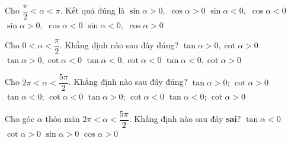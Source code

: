

\begin{ex}%
	Cho $\dfrac{\pi}{2} <\alpha <\pi $. Kết quả đúng là 
	 \choice
		{$\sin \alpha >0,$  $\cos \alpha >0$}
		{$\sin \alpha <0,$ $\cos \alpha  <0$}
		{\True $\sin  \alpha >0,$ $\cos \alpha <0$}
		{$\sin \alpha  <0,$ $\cos \alpha >0$}
\end{ex}

\begin{ex}%
	Cho $0<\alpha <\dfrac{\pi}{2}$. Khẳng định nào  sau đây đúng?
	\choice 
		{\True $\tan \alpha  >0,\cot \alpha >0$}
		{$\tan \alpha >0,\cot \alpha <0$} 
		{$\tan \alpha <0,\cot \alpha <0$} 
		{$\tan \alpha <0,\cot  \alpha >0$}
\end{ex}

\begin{ex}%
	 Cho $2\pi <\alpha <\dfrac{5\pi}{2}$. Khẳng định nào sau đây đúng?
	\choice 
		 {\True $\tan \alpha >0$; $\cot \alpha >0$}
		{$\tan \alpha <0$; $\cot  \alpha <0$}
		 {$\tan \alpha >0$; $\cot \alpha <0$}
		{$\tan  \alpha <0$; $\cot \alpha >0$}
\end{ex}

\begin{ex}%
	 Cho góc $\alpha $ thỏa mãn $2\pi <\alpha <\dfrac{5\pi}{2} $. Khẳng định nào sau đây \textbf{sai}?
	\choice 
		{\True $\tan  \alpha <0$}
		{$\cot  \alpha >0$}
		{$\sin  \alpha >0$}
		{$\cos \alpha >0$} 
\end{ex}

